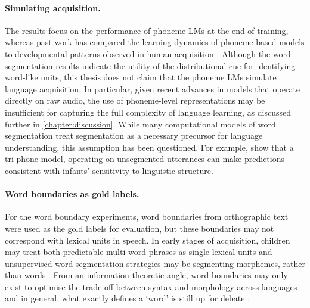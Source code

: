 \paragraph{Simulating acquisition.} The results focus on the performance of phoneme LMs at the end of training, whereas past work has compared the learning dynamics of phoneme-based models to developmental patterns observed in human acquisition \citep{kirov-2018-recurrent}. Although the word segmentation results indicate the utility of the distributional cue for identifying word-like units, this thesis does not claim that the phoneme LMs simulate language acquisition. In particular, given recent advances in models that operate directly on raw audio, the use of phoneme-level representations may be insufficient for capturing the full complexity of language learning, as discussed further in \cref{chapter:discussion}. While many computational models of word segmentation treat segmentation as a necessary precursor for language understanding, this assumption has been questioned. For example, \citet{baayen2016} show that a tri-phone model, operating on unsegmented utterances can make predictions consistent with infants' sensitivity to linguistic structure. 


\paragraph{Word boundaries as gold labels.} For the word boundary experiments, word boundaries from orthographic text were used as the gold labels for evaluation, but these boundaries may not correspond with lexical units in speech. In early stages of acquisition, children may treat both predictable multi-word phrases as single lexical units \citep{macwhinney1978} and unsupervised word segmentation strategies may be segmenting morphemes, rather than words \citep{fleck2008lexicalized}. From an information-theoretic angle, word boundaries may only exist to optimise the trade-off between syntax and morphology across languages \citep{koplenig2017statistical, mosteiro2025word} and in general, what exactly defines a `word' is still up for debate \citep{dixon2002word, haspelmath2023defining}. 

